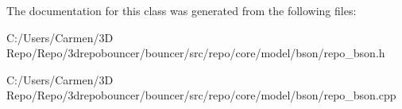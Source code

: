 The documentation for this class was generated from the following files\+:\begin{DoxyCompactItemize}
\item 
C\+:/\+Users/\+Carmen/3\+D Repo/\+Repo/3drepobouncer/bouncer/src/repo/core/model/bson/repo\+\_\+bson.\+h\item 
C\+:/\+Users/\+Carmen/3\+D Repo/\+Repo/3drepobouncer/bouncer/src/repo/core/model/bson/repo\+\_\+bson.\+cpp\end{DoxyCompactItemize}
